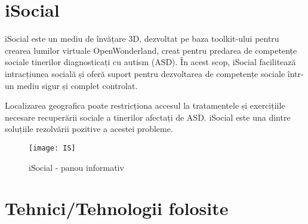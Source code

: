 \section{iSocial}

\par iSocial este un mediu de învățare 3D, dezvoltat pe baza toolkit-ului pentru crearea lumilor virtuale OpenWonderland, creat pentru predarea de competențe sociale tinerilor diagnosticați cu autism (ASD). În acest scop, iSocial facilitează intracțiunea socială și oferă suport pentru dezvoltarea de competențe sociale într-un mediu sigur și complet controlat.
\par Localizarea geografica poate restricționa accesul la tratamentele și exercițiile necesare recuperării sociale a tinerilor afectați de ASD. iSocial este una dintre soluțiile rezolvării pozitive a acestei probleme.

\begin{figure}[h]
    \centering
    \texttt{[image: IS]}
    \caption{iSocial - panou informativ }
    \label{fig:imag5}
\end{figure}

\section{Tehnici/Tehnologii folosite}

